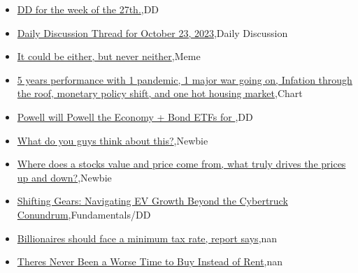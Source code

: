 \documentclass{article}%
\begin{document}
%
\begin{itemize}%
\item%
\href{https://reddit.com/r/wallstreetbets/comments/17ehqro/dd\_for\_the\_week\_of\_the\_27th/}{DD for the week of the 27th.},DD%
\item%
\href{https://reddit.com/r/wallstreetbets/comments/17egrj3/daily\_discussion\_thread\_for\_october\_23\_2023/}{Daily Discussion Thread for October 23, 2023},Daily Discussion%
\item%
\href{https://reddit.com/r/wallstreetbets/comments/17eg9u7/it\_could\_be\_either\_but\_never\_neither/}{It could be either, but never neither},Meme%
\item%
\href{https://reddit.com/r/wallstreetbets/comments/17eexs4/5\_years\_performance\_with\_1\_pandemic\_1\_major\_war/}{5 years performance with 1 pandemic, 1 major war going on, Infation through the roof, monetary policy shift, and one hot housing market},Chart%
\item%
\href{https://reddit.com/r/wallstreetbets/comments/17ee1e1/powell\_will\_powell\_the\_economy\_bond\_etfs\_for/}{Powell will Powell the Economy + Bond ETFs for  },DD%
\item%
\href{https://reddit.com/r/StockMarket/comments/17dyuow/what\_do\_you\_guys\_think\_about\_this/}{What do you guys think about this?},Newbie%
\item%
\href{https://reddit.com/r/StockMarket/comments/17dwq7f/where\_does\_a\_stocks\_value\_and\_price\_come\_from/}{Where does a stocks value and price come from, what truly drives the prices up and down?},Newbie%
\item%
\href{https://reddit.com/r/StockMarket/comments/17djtlk/shifting\_gears\_navigating\_ev\_growth\_beyond\_the/}{Shifting Gears: Navigating EV Growth Beyond the Cybertruck Conundrum},Fundamentals/DD%
\item%
\href{https://reddit.com/r/Economics/comments/17ehf3r/billionaires\_should\_face\_a\_minimum\_tax\_rate/}{Billionaires should face a minimum tax rate, report says},nan%
\item%
\href{https://reddit.com/r/Economics/comments/17ebh4s/theres\_never\_been\_a\_worse\_time\_to\_buy\_instead\_of/}{Theres Never Been a Worse Time to Buy Instead of Rent},nan%
\end{itemize}%
\end{document}
